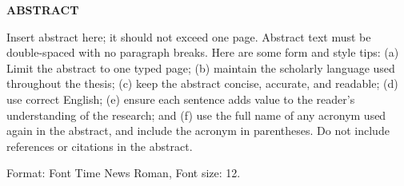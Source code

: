 \newpage

\begin{center}
    \fontsize{14}{16}\selectfont
    \textbf{ABSTRACT}
\end{center}
\vspace{-0.3cm}
\doublespacing
\justifying

Insert abstract here; it should not exceed one page. Abstract text must be double-spaced with no paragraph breaks. Here are 
some form and style tips: (a) Limit the abstract to one typed page; (b) maintain the scholarly language used throughout the 
thesis; (c) keep the abstract concise, accurate, and readable; (d) use correct English; (e) ensure each sentence adds value to 
the reader’s understanding of the research; and (f) use the full name of any acronym used again in the abstract, and include the 
acronym in parentheses. Do not include references or citations in the abstract. 

Format: Font Time News Roman, Font size: 12.
